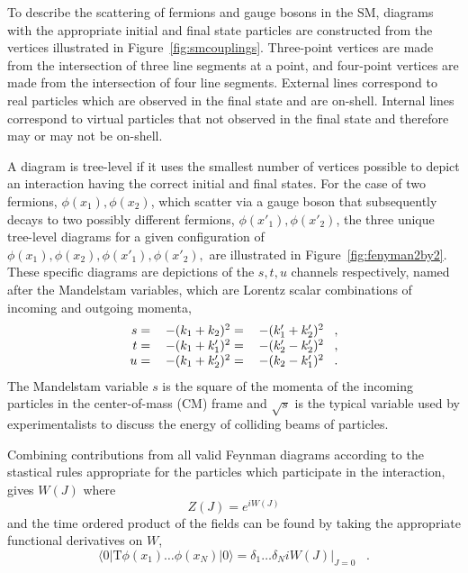  To describe the scattering of fermions
  and gauge bosons in the SM,
  diagrams with the appropriate initial and final
  state particles are constructed from the 
  vertices illustrated in Figure~\ref{fig:smcouplings}.
 Three-point vertices are made
  from the intersection of three line segments
  at a point, and four-point vertices
  are made from the intersection of four
  line segments.
 External lines correspond to real particles
  which are observed in the final state
  and are on-shell.
 Internal lines correspond to virtual
  particles that not observed in the 
  final state and therefore 
  may or may not be on-shell.

 A diagram is tree-level if it 
  uses the smallest number of vertices possible
  to depict an interaction having the
  correct initial and final states.
 For the case of two fermions, $\phi(x_1),\phi(x_2)$, which scatter
  via a gauge boson that subsequently decays
  to two possibly different fermions, $\phi(x'_1),\phi(x'_2)$,
  the three unique tree-level diagrams for a given 
  configuration of $\phi(x_1),\phi(x_2),\phi(x'_1),\phi(x'_2),$ are
  illustrated in Figure~\ref{fig:fenyman2by2}.
 These specific diagrams 
  are depictions of the $s,t,u$ channels respectively,
  named after the Mandelstam variables,
  which are Lorentz scalar
  combinations of incoming and outgoing momenta,
\begin{equation}
\begin{tabular}{rll} 
$ s = $ & $ - (k_1 + k_2)^2  = $ & $-(k_1' + k_2')^2\;\;\;,$ \\
$ t = $ & $ - (k_1 + k_1')^2 = $ & $-(k_2' - k_2')^2\;\;\;,$ \\
$ u = $ & $ - (k_1 + k_2')^2 = $ & $-(k_2 - k_1')^2 \;\;\;.$
\end{tabular}
\end{equation}
 The Mandelstam variable $s$ is the square of the momenta
  of the incoming particles in the center-of-mass (CM) frame
  and $\sqrt{s}$ is the typical variable used by experimentalists
  to discuss the energy of colliding beams of particles.

 Combining contributions from all
  valid Feynman diagrams 
  according to the stastical rules appropriate
  for the particles which participate in the
  interaction, gives $W(J)$ where 
\begin{equation}
Z(J)=e^{iW(J)}
\end{equation}
  and the time ordered product of the fields
  can be found by taking the appropriate
  functional derivatives on $W$,
\begin{equation}
 \langle 0 | \mathrm{T}\phi(x_1)\dots\phi(x_N) | 0 \rangle = 
  \delta_1\dots\delta_N i W(J) |_{J=0}\;\;\;.
\end{equation}
  

